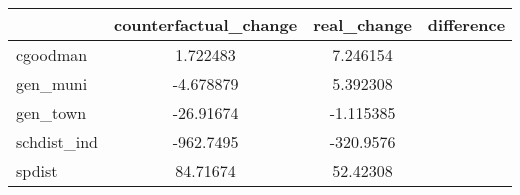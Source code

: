 {
\def\sym#1{\ifmmode^{#1}\else\(^{#1}\)\fi}
\begin{tabular}{l*{1}{ccc}}
\toprule
                              &counterfactual\_change& real\_change&  difference\\
\midrule
cgoodman                      &    1.722483&    7.246154&            \\
gen\_muni                      &   -4.678879&    5.392308&            \\
gen\_town                      &   -26.91674&   -1.115385&            \\
schdist\_ind                   &   -962.7495&   -320.9576&            \\
spdist                        &    84.71674&    52.42308&            \\
\bottomrule
\end{tabular}
}
